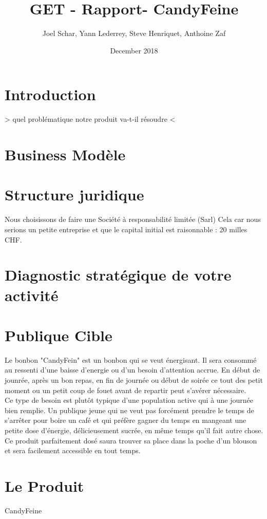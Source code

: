 \documentclass{article}
\title{GET - Rapport- CandyFeine}
\author{Joel Schar, Yann Lederrey, Steve Henriquet, Anthoine Zaf }
\date{December 2018}
\begin{document}
\maketitle

\section{Introduction}
> quel problématique notre produit va-t-il résoudre <

\section{Business Modèle}

\section{Structure juridique}
Nous choisissons de faire une Société à responsabilité limitée (Sarl)
Cela car nous serions un petite entreprise et que le capital initial est raisonnable : 20 milles CHF.

\section{Diagnostic stratégique de votre activité}

\section{Publique Cible}
Le bonbon "CandyFein" est un bonbon qui se veut énergisant. Il sera consommé au ressenti d'une baisse d'energie ou d'un besoin d'attention accrue. En début de jounrée, après un bon repas, en fin de journée ou début de soirée ce tout des petit moment ou un petit coup de fouet avant de repartir peut s'avérer nécessaire.\\
Ce type de besoin est plutôt typique d'une population active qui à une journée bien remplie. Un publique jeune qui ne veut pas forcément prendre le temps de s'arrêter pour boire un café et qui préfère gagner du temps en mangeant une petite dose d'énergie, délicieusement sucrée, en même temps qu'il fait autre chose.\\
Ce produit parfaitement dosé saura trouver sa place dans la poche d'un blouson et sera facilement accessible en tout temps.\\

\section{Le Produit}
CandyFeine
\end{document}
